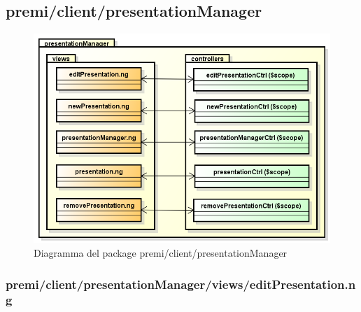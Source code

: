 \subsection{premi/client/presentationManager}
\begin{figure}[h]
\begin{center}
\includegraphics[scale=0.50]{img/diapkg/presentationManager.png}
\caption{Diagramma del package premi/client/presentationManager}
\end{center}
\end{figure}











\subsubsection{premi/client/presentationManager/views/editPresentation.ng}

